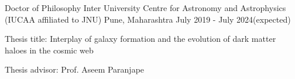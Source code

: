 


\begin{cventries}
{
\cventry
{Doctor of Philosophy}
{Inter University Centre for Astronomy and Astrophysics (IUCAA affiliated to JNU)}
{Pune, Maharashtra}
{July 2019 - July 2024(expected) }
{
\begin{cvitems}
\item Thesis title: Interplay of galaxy formation and the evolution of dark matter haloes in the cosmic web
\item Thesis advisor: Prof. Aseem Paranjape
\end{cvitems}
}
}


\end{cventries}
